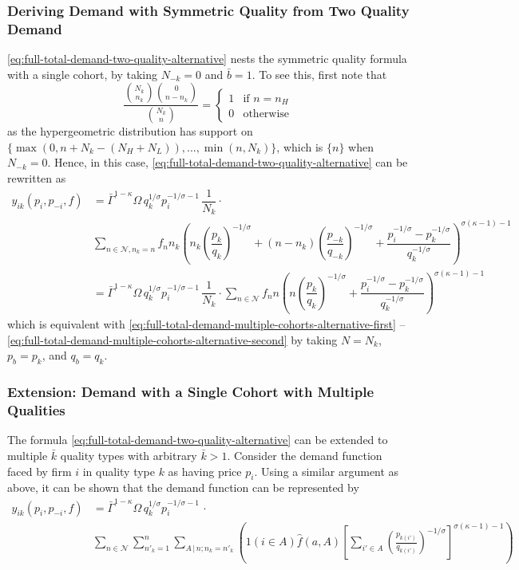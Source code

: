 \documentclass[12pt]{article}
\begin{document}
\subsubsection{Deriving Demand with Symmetric Quality from Two Quality Demand}
\eqref{eq:full-total-demand-two-quality-alternative} nests the symmetric quality formula with a single cohort, by taking $N_{-k} = 0$ and $\bar b = 1$. To see this, first note that
\begin{equation}
\dfrac{\binom{N_k}{n_k} \binom{0}{n - n_k}}{\binom{N_k}{n}} = 
\begin{cases}
1 & \text{if $n = n_H$} \\
0 & \text{otherwise} 
\end{cases}
\end{equation}
as the hypergeometric distribution has support on $\{\max(0, n+N_k - (N_H + N_L) ), ..., \min (n, N_k )  \}$, which is $\{n\}$ when $N_{-k} = 0$. Hence, in this case, \eqref{eq:full-total-demand-two-quality-alternative} can be rewritten as
\begin{align}
 y_{ik}(p_i, p_{-i}, f) 
&=  \bar{\Gamma}^{1-\kappa}\Omega \, q_k^{1/\sigma}p_i^{-1/\sigma - 1}\, \dfrac{1}{N_k} \cdot \\ 
&\sum_{n \in \mathcal{N}, n_k = n } f_{n}  
n_k 
\left( 
n_k \left( \dfrac{p_{k}}{q_{k}}   \right)^{-1/\sigma} +  
(n - n_k) \left( \dfrac{p_{-k}}{q_{-k}}   \right)^{-1/\sigma} +
\dfrac{p_i^{-1/\sigma} - p^{-1/\sigma}_{k} }{ q_k^{-1/\sigma }} 
\right)^{\sigma (\kappa - 1)-1}  \\
&=  \bar{\Gamma}^{1-\kappa}\Omega \, q_k^{1/\sigma}p_i^{-1/\sigma - 1}\, \dfrac{1}{N_k} \cdot \sum_{n \in \mathcal{N}} f_{n}  
n
\left( 
n \left( \dfrac{p_{k}}{q_{k}}   \right)^{-1/\sigma} +  
\dfrac{p_i^{-1/\sigma} - p^{-1/\sigma}_{k} }{ q_k^{-1/\sigma }} 
\right)^{\sigma (\kappa - 1)-1}
\end{align}
which is equivalent with \eqref{eq:full-total-demand-multiple-cohorts-alternative-first} -- \eqref{eq:full-total-demand-multiple-cohorts-alternative-second} by taking $N = N_k$, $p_b = p_k$, and $q_b = q_k$.


\subsubsection{Extension: Demand with a Single Cohort with Multiple Qualities}
The formula \eqref{eq:full-total-demand-two-quality-alternative} can be extended to multiple ${\bar k}$ quality types with arbitrary ${\bar k} > 1$. Consider the demand function faced by firm $i$ in quality type $k$ as having price $p_i$. Using a similar argument as above, it can be shown that the demand function can be represented by
\begin{align}
y_{ik}(p_i, p_{-i}, f) 
&= \bar{\Gamma}^{1-\kappa}\Omega \, q_k^{1/\sigma}p_i^{-1/\sigma - 1}\, \cdot \\ 
&\sum_{n \in \mathcal{N} } \sum_{n'_k =1}^n \sum_{{A}\,|\,n; n_k = n'_k}\left( 1( i \in A ) \hat{f}(a,A)\left[\sum_{i'\in A}\left( \frac{p_{k(i')}}{q_{k(i')}}\right)^{-1/\sigma}\right]^{\sigma (\kappa - 1)-1}\right)  
\label{eq:full-total-demand-multiple-quality-summand}
\end{align}
\end{document}
